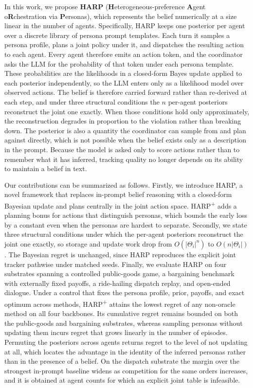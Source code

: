 \documentclass[letterpaper]{article} %
\begin{document}
In this work, we propose \textbf{HARP} (\textbf{H}eterogeneous-preference \textbf{A}gent o\textbf{R}chestration via \textbf{P}ersonas), which represents the belief numerically at a size linear in the number of agents. Specifically, HARP keeps one posterior per agent over a discrete library of persona prompt templates. Each turn it samples a persona profile, plans a joint policy under it, and dispatches the resulting action to each agent. Every agent therefore emits an action token, and the coordinator asks the LLM for the probability of that token under each persona template. These probabilities are the likelihoods in a closed-form Bayes update applied to each posterior independently, so the LLM enters only as a likelihood model over observed actions. The belief is therefore carried forward rather than re-derived at each step, and under three structural conditions the $n$ per-agent posteriors reconstruct the joint one exactly. When those conditions hold only approximately, the reconstruction degrades in proportion to the violation rather than breaking down. The posterior is also a quantity the coordinator can sample from and plan against directly, which is not possible when the belief exists only as a description in the prompt. Because the model is asked only to score actions rather than to remember what it has inferred, tracking quality no longer depends on its ability to maintain a belief in text.

Our contributions can be summarized as follows. Firstly, we introduce HARP, a novel framework that replaces in-prompt belief reasoning with a closed-form Bayesian update and plans centrally in the joint action space. HARP\textsuperscript{+} adds a planning bonus for actions that distinguish personas, which bounds the early loss by a constant even when the personas are hardest to separate. Secondly, we state three structural conditions under which the per-agent posteriors reconstruct the joint one exactly, so storage and update work drop from $O(|\Theta_i|^n)$ to $O(n|\Theta_i|)$. The Bayesian regret is unchanged, since HARP reproduces the explicit joint tracker pathwise under matched seeds. Finally, we evaluate HARP on four substrates spanning a controlled public-goods game, a bargaining benchmark with externally fixed payoffs, a ride-hailing dispatch replay, and open-ended dialogue. Under a control that fixes the persona profile, prior, payoffs, and exact optimum across methods, HARP\textsuperscript{+} attains the lowest regret of any non-oracle method on all four backbones. Its cumulative regret remains bounded on both the public-goods and bargaining substrates, whereas sampling personas without updating them incurs regret that grows linearly in the number of episodes. Permuting the posteriors across agents returns regret to the level of not updating at all, which locates the advantage in the identity of the inferred personas rather than in the presence of a belief. On the dispatch substrate the margin over the strongest in-prompt baseline widens as competition for the same orders increases, and it is obtained at agent counts for which an explicit joint table is infeasible.
\end{document}
